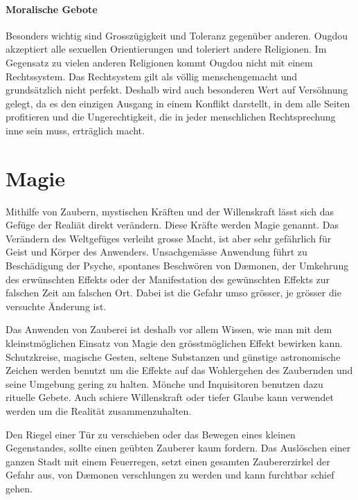 \documentclass[12pt,twoside,twocolumn,openany]{book}
\begin{document}
\subsubsection{Moralische Gebote}
Besonders wichtig sind Grosszügigkeit und Toleranz gegenüber anderen. Ougdou akzeptiert alle sexuellen Orientierungen und toleriert andere Religionen. Im Gegensatz zu vielen anderen Religionen kommt Ougdou nicht mit einem Rechtssystem. Das Rechtsystem gilt als völlig menschengemacht und grundsätzlich nicht perfekt. Deshalb wird auch besonderen Wert auf Versöhnung gelegt, da es den einzigen Ausgang in einem Konflikt darstellt, in dem alle Seiten profitieren und die Ungerechtigkeit, die in jeder menschlichen Rechtsprechung inne sein muss, erträglich macht.


\chapter{Magie}
Mithilfe von Zaubern, mystischen Kräften und der Willenskraft lässt sich das Gefüge der Realiät direkt verändern. Diese Kräfte werden Magie genannt. Das Verändern des Weltgefüges verleiht grosse Macht, ist aber sehr gefährlich für Geist und Körper des Anwenders. Unsachgemässe Anwendung führt zu Beschädigung der Psyche, spontanes Beschwören von D\ae monen, der Umkehrung des erwünschten Effekts oder der Manifestation des gewünschten Effekts zur falschen Zeit am falschen Ort. Dabei ist die Gefahr umso grösser, je grösser die versuchte Änderung ist.

Das Anwenden von Zauberei ist deshalb vor allem Wissen, wie man mit dem kleinstmöglichen Einsatz von Magie den grösstmöglichen Effekt bewirken kann. Schutzkreise, magische Gesten, seltene Substanzen und günstige astronomische Zeichen werden benutzt um die Effekte auf das Wohlergehen des Zaubernden und seine Umgebung gering zu halten. Mönche und Inquisitoren benutzen dazu rituelle Gebete. Auch schiere Willenskraft oder tiefer Glaube kann verwendet werden um die Realität zusammenzuhalten.

Den Riegel einer Tür zu verschieben oder das Bewegen eines kleinen Gegenstandes, sollte einen geübten Zauberer kaum fordern. Das Auslöschen einer ganzen Stadt mit einem Feuerregen, setzt einen gesamten Zaubererzirkel der Gefahr aus, von D\ae monen verschlungen zu werden und kann furchtbar schief gehen.
\end{document}
